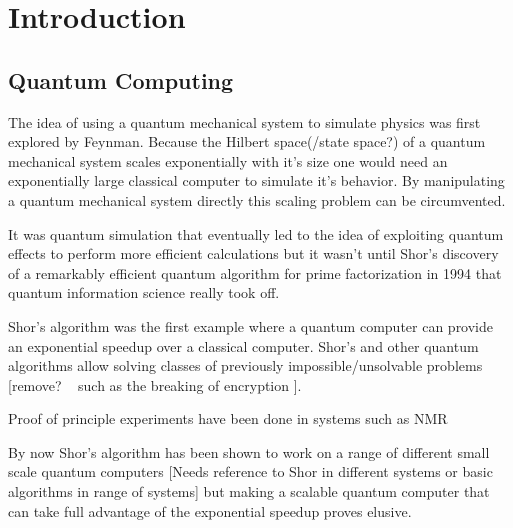 \chapter{Introduction}

\section{Quantum Computing}

The idea of using a quantum mechanical system to simulate physics was first explored by Feynman\cite{Feynman1982Simulating}. Because the Hilbert space(/state space?)  of a quantum mechanical system scales  exponentially with it's size one would need an exponentially large classical computer to simulate it's behavior. By manipulating a quantum mechanical system directly this scaling problem can be circumvented.

It was quantum simulation that eventually led to the idea of exploiting quantum effects to perform more efficient calculations but it wasn't until Shor's discovery of a remarkably efficient quantum algorithm for prime factorization in 1994 \cite{Shor1994Algorithms} that quantum information science really took off.

Shor's algorithm was the first example where a quantum computer can provide an exponential speedup over a classical computer. Shor's and other quantum algorithms allow solving classes of previously impossible/unsolvable problems [remove? ~ such as the breaking of encryption ].

Proof of principle experiments have been done in systems such as NMR \cite{Vandersypen2001Experimental}


By now Shor's algorithm has been shown to work on a range of different small scale quantum computers \cite{Vandersypen2001Experimental} [Needs reference to Shor in different systems or basic algorithms in range of systems] but making a scalable quantum computer that can take full advantage of the exponential speedup  proves elusive.



